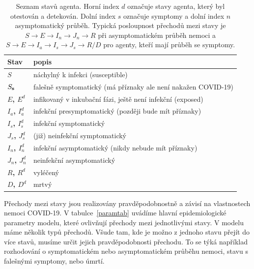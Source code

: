 \begin{table}
\centering
  \begin{tabular}{lp{}}
    \hline
		Stav & popis \\\hline
    {\bf $S$} & náchylný k infekci (susceptible)\\
    {\bf $S_{\bf s}$} & falešně symptomatický (má příznaky ale není nakažen COVID-19)\\ 
    {\bf $E$, $E^d$} & infikovaný v inkubační fázi, ještě není infekční (exposed) \\
    {\bf $I_{a}$, $I^d_{a}$} & infekční presymptomatický (později bude mít příznaky) \\
    {\bf $I_{s}$, $I^d_{s}$} & infekční symptomatický \\ 
    {\bf $J_{s}$, $J^d_{s}$} & (již) neinfekční symptomatický \\ 
    {\bf $I_{n}$, $I^d_{n}$} & infekční asymptomatický (nikdy nebude mít příznaky) \\ 
    {\bf $J_{ n}$, $J^d_{n}$} & neinfekční asymptomatický \\ 
    {\bf $R$, $R^{d}$} & vyléčený \\
    {\bf $D$, $D^{d}$} & mrtvý  \\
    \hline
  \end{tabular}
  \caption{Seznam stavů agenta. Horní index $d$ označuje stavy agenta, který byl otestován a detekován. Dolní index $s$ označuje symptomy a dolní index $n$ asymptomatický průběh. Typická posloupnost přechodů mezi stavy je $ S \rightarrow  E \rightarrow I_n \rightarrow J_n \rightarrow R$ při asymptomatickém průběh nemoci a $S \rightarrow E \rightarrow I_a \rightarrow I_s \rightarrow J_s \rightarrow R/D$ pro agenty, kteří mají průběh se symptomy.}
  \label{tab:states}
\end{table} 

Přechody mezi stavy jsou realizovány pravděpodobnostně a závisí na vlastnostech nemoci COVID-19. V tabulce~\ref{paramtab} uvádíme hlavní epidemiologické parametry modelu, které ovlivňují přechody mezi jednotlivými stavy. V modelu máme několik typů přechodů. Všude tam, kde je možno z jednoho stavu přejít do více stavů, musíme určit jejich pravděpodobnosti přechodu. To se týká například rozhodování o symptomatickém nebo asymptomatickém průběhu nemoci, stavu s falešnými symptomy, nebo úmrtí. 

